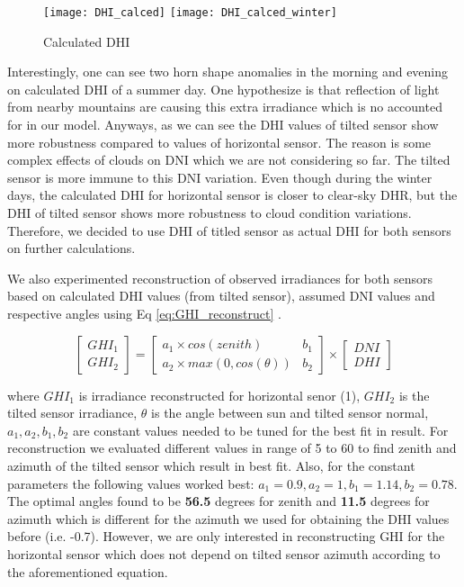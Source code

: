 \begin{figure}[h]
\caption{Calculated DHI}
\label{fig:calc_DHI_day}
\texttt{[image: DHI\_calced]}
\texttt{[image: DHI\_calced\_winter]}
\centering
\end{figure}

Interestingly, one can see two horn shape anomalies in the morning and evening on calculated DHI of a summer day. One hypothesize is that reflection of light from nearby mountains are causing this extra irradiance which is no accounted for in our model. Anyways, as we can see the DHI values of tilted sensor show more robustness compared to values of horizontal sensor. The reason is some complex effects of clouds on DNI which we are not considering so far. The tilted sensor is more immune to this DNI variation. Even though during the winter days, the calculated DHI for horizontal sensor is closer to clear-sky DHR, but the DHI of tilted sensor shows more robustness to cloud condition variations. Therefore, we decided to use DHI of titled sensor as actual DHI for both sensors on further calculations.

We also experimented reconstruction of observed irradiances for both sensors based on calculated DHI values (from tilted sensor), assumed DNI values and respective angles using Eq \ref{eq:GHI_reconstruct} . 

\begin{equation}
\label{eq:GHI_reconstruct}
\left[ \begin{array}{c} GHI_1 \\ GHI_2 \end{array} \right] = \begin{bmatrix} a_1 \times cos(zenith) & b_1 \\ a_2 \times max(0, cos(\theta)) & b_2 \end{bmatrix} \times \left[ \begin{array}{c} DNI \\ DHI \end{array} \right]
\end{equation}

where $GHI_1$ is irradiance reconstructed for horizontal senor (1), $GHI_2$ is the tilted sensor irradiance, $\theta$ is the angle between sun and tilted sensor normal, $a_1, a_2, b_1, b_2$ are constant values needed to be tuned for the best fit in result. For reconstruction we evaluated different values in range of 5 to 60 to find zenith and azimuth of the tilted sensor which result in best fit. Also, for the constant parameters the following values worked best: $a_1=0.9, a_2=1, b_1=1.14, b_2=0.78$. The optimal angles found to be \textbf{56.5} degrees for zenith and \textbf{11.5} degrees for azimuth which is different for the azimuth we used for obtaining the DHI values before (i.e. -0.7). However, we are only interested in reconstructing GHI for the horizontal sensor which does not depend on tilted sensor azimuth according to the aforementioned equation.

